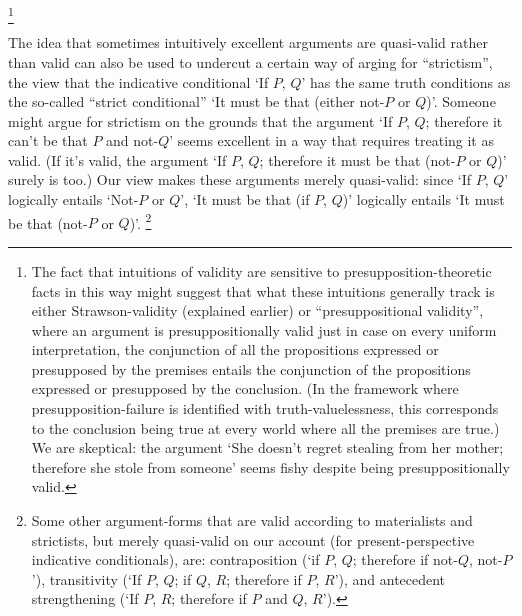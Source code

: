 \documentclass[If.tex]{subfiles}
\begin{document}
\footnote{The fact that intuitions of validity are sensitive to presupposition-theoretic facts in this way might suggest that what these intuitions generally track is either Strawson-validity (explained earlier) or “presuppositional validity”, where an argument is presuppositionally valid just in case on every uniform interpretation, the conjunction of all the propositions expressed or presupposed by the premises entails the conjunction of the propositions expressed or presupposed by the conclusion.  (In the framework where presupposition-failure is identified with truth-valuelessness, this corresponds to the conclusion being true at every world where all the premises are true.)  We are skeptical: the argument ‘She doesn't regret stealing from her mother; therefore she stole from someone’ seems fishy despite being presuppositionally valid.}  




The idea that sometimes intuitively excellent arguments are quasi-valid rather than valid can also be used to undercut a certain way of arging for “strictism”, the view that the indicative conditional ‘If $P$, $Q$’ has the same truth conditions as the so-called “strict conditional” ‘It must be that (either not-$P$ or $Q$)’.  Someone might argue for strictism on the grounds that the argument ‘If $P$, $Q$; therefore it can't be that $P$ and not-$Q$’ seems excellent in a way that requires treating it as valid.  (If it's valid, the argument ‘If $P$, $Q$; therefore it must be that (not-$P$ or $Q$)’ surely is too.)  Our view makes these arguments merely quasi-valid: since ‘If $P$, $Q$’ logically entails ‘Not-$P$ or $Q$’, ‘It must be that (if $P$, $Q$)’ logically entails ‘It must be that (not-$P$ or $Q$)’.%
\footnote{Some other argument-forms that are valid according to materialists and strictists, but merely quasi-valid on our account (for present-perspective indicative conditionals), are: contraposition (‘if $P$, $Q$; therefore if not-$Q$, not-$P$’), transitivity (‘If $P$, $Q$; if $Q$, $R$; therefore if $P$, $R$’), and antecedent strengthening (‘If $P$, $R$; therefore if $P$ and $Q$, $R$’).}
\end{document}
